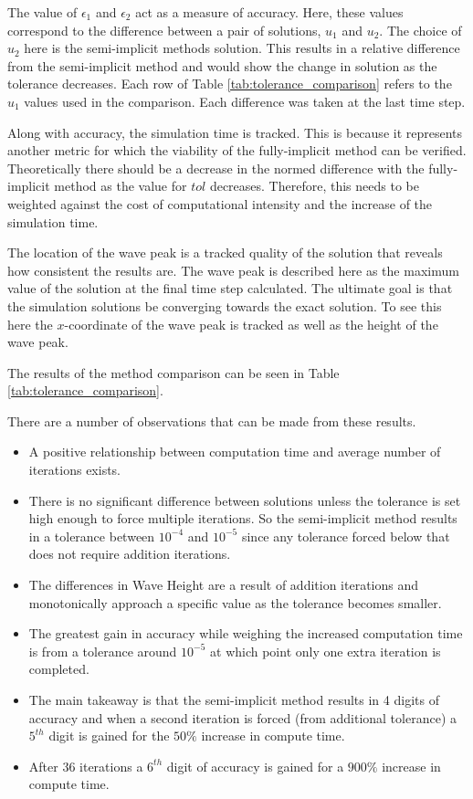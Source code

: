   The value of $\epsilon_1$ and $\epsilon_2$ act as a measure of accuracy.
  Here, these values correspond to the difference between a pair of solutions, $u_1$ and $u_2$.
  The choice of $u_2$ here is the semi-implicit methods solution.
  This results in a relative difference from the semi-implicit method and would show the change in solution as the tolerance decreases.
  Each row of Table \ref{tab:tolerance_comparison} refers to the $u_1$ values used in the comparison.
  Each difference was taken at the last time step.

  Along with accuracy, the simulation time is tracked.
  This is because it represents another metric for which the viability of the fully-implicit method can be verified.
  Theoretically there should be a decrease in the normed difference with the fully-implicit method as the value for $tol$ decreases.
  Therefore, this needs to be weighted against the cost of computational intensity and the increase of the simulation time.

  The location of the wave peak is a tracked quality of the solution that reveals how consistent the results are.
  The wave peak is described here as the maximum value of the solution at the final time step calculated.
  The ultimate goal is that the simulation solutions be converging towards the exact solution.
  To see this here the $x$-coordinate of the wave peak is tracked as well as the height of the wave peak.

  The results of the method comparison can be seen in Table \ref{tab:tolerance_comparison}.

  

  There are a number of observations that can be made from these results.
  \begin{itemize}
    \item A positive relationship between computation time and average number of iterations exists.
    \item There is no significant difference between solutions unless the tolerance is set high enough to force multiple iterations. 
          So the semi-implicit method results in a tolerance between $10^{-4}$ and $10^{-5}$ since any tolerance forced below that does not require addition iterations.
    \item The differences in Wave Height are a result of addition iterations and monotonically approach a specific value as the tolerance becomes smaller.
    \item The greatest gain in accuracy while weighing the increased computation time is from a tolerance around $10^{-5}$ at which point only one extra iteration is completed.
    \item The main takeaway is that the semi-implicit method results in 4 digits of accuracy and when a second iteration is forced (from additional tolerance) a $5^{th}$ digit is gained for the $50\%$ increase in compute time.
    \item After $36$ iterations a $6^{th}$ digit of accuracy is gained for a $900\%$ increase in compute time.
  \end{itemize}
  
